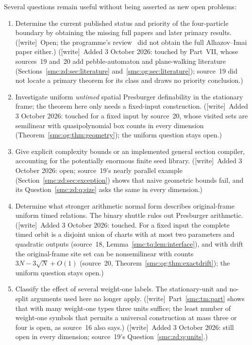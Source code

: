 \documentclass[11pt,letterpaper]{article}
\numberwithin{equation}{section}
\theoremstyle{definition}
\theoremstyle{remark}
\newcommand{\wtag}{\textup{[write]}}
\begin{document}
Several questions remain useful without being asserted as new open problems:
\begin{enumerate}
\item\label{smc:fm:q:status} Determine the current published status and priority of the four-particle
boundary by obtaining the missing full papers and later primary results. (\wtag\ Open; the programme's review~\cite{reviewlowmass} did not obtain the full Alhazov--Imai paper either.) (\wtag\ Added 3 October 2026: touched by Part~VII, whose sources~19 and~20 add pebble-automaton and plane-walking literature (Sections~\ref{smc:zd:sec:literature} and~\ref{smc:og:sec:literature}); source~19 did not locate a primary theorem for its class and draws no priority conclusion.)
\item\label{smc:fm:q:uniform} Investigate uniform \emph{untimed} spatial Presburger definability in the
stationary frame; the theorem here only needs a fixed-input construction. (\wtag\ Added 3 October 2026: touched for a fixed input by source~20, whose visited sets are semilinear with quasipolynomial box counts in every dimension (Theorem~\ref{smc:og:thm:geometry}); the uniform question stays open.)
\item\label{smc:fm:q:complexity} Give explicit complexity bounds or an implemented general section
compiler, accounting for the potentially enormous finite seed library. (\wtag\ Added 3 October 2026: open; source~19's nearly parallel example (Section~\ref{smc:zd:sec:exception}) shows that naive geometric bounds fail, and its Question~\ref{smc:zd:q:size} asks the same in every dimension.)
\item\label{smc:fm:q:normalform} Determine what stronger arithmetic normal form describes original-frame
uniform timed relations. The binary shuttle rules out Presburger arithmetic. (\wtag\ Added 3 October 2026: touched. For a fixed input the complete timed orbit is a disjoint union of charts with at most two parameters and quadratic outputs (source~18, Lemma~\ref{smc:tq:lem:interface}), and with drift the original-frame site set can be nonsemilinear with counts $3N-3\sqrt N+O(1)$ (source~20, Theorem~\ref{smc:og:thm:exactdrift}); the uniform question stays open.)
\item\label{smc:fm:q:severalunits} Classify the effect of several weight-one labels. The stationary-unit
and no-split arguments used here no longer apply. (\wtag\ Part~\ref{smc:tm:part} shows that with many weight-one types three units suffice; the least number of weight-one symbols that permits a universal construction at mass three or four is open, as source~16 also says.) (\wtag\ Added 3 October 2026: still open in every dimension; source~19's Question~\ref{smc:zd:q:units}.)

\end{enumerate}
\end{document}
